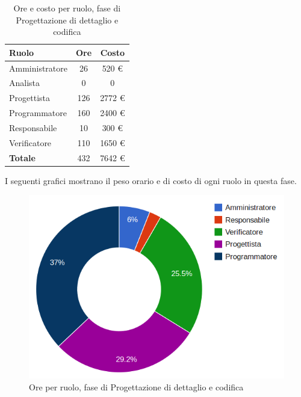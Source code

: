 \begin{table}[H]
	\centering
	\begin{tabular}{ l c c }
	\textbf{Ruolo} & \textbf{Ore} & \textbf{Costo} \\
	\hline
	Amministratore & 26 & 520 €\\
	Analista & 0 & 0 \\
	Progettista & 126 & 2772 €\\
	Programmatore & 160 & 2400 €\\
	Responsabile & 10 & 300 €\\
	Verificatore & 110 & 1650 €\\
	\hline
	\textbf{Totale} & 432 & 7642 €\\
	\hline
	\end{tabular}
	\caption{Ore e costo per ruolo, fase di Progettazione di dettaglio e codifica}
	\end{table}

I seguenti grafici mostrano il peso orario e di costo di ogni ruolo in questa fase.

\begin{figure}[H]
\centering
\includegraphics[scale=0.35]{5-3-1.png}
\caption{Ore per ruolo, fase di Progettazione di dettaglio e codifica\label{fig:nome}}
\end{figure}

